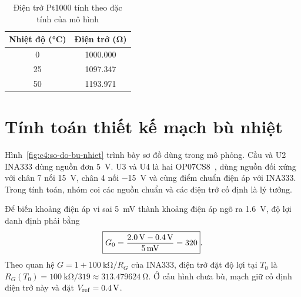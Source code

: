 \begin{table}[H]
    \centering
    \caption{Điện trở Pt1000 tính theo đặc tính của mô hình}
    \label{tab:c4:dien-tro-pt1000}
    \renewcommand{\arraystretch}{1.3}
    \begin{tabular}{|c|c|}
        \hline
        \textbf{Nhiệt độ (\unit{\celsius})} &
        \textbf{Điện trở (\unit{\ohm})} \\ \hline
        0  & 1000.000 \\ \hline
        25 & 1097.347 \\ \hline
        50 & 1193.971 \\ \hline
    \end{tabular}
\end{table}



\section{Tính toán thiết kế mạch bù nhiệt}
\label{sec:c4:tinh-toan}

Hình~\ref{fig:c4:so-do-bu-nhiet} trình bày sơ đồ dùng trong mô phỏng.
Cầu và U2 INA333 dùng nguồn đơn \qty{5}{\volt}. U3 và U4 là hai
OP07CS8~\cite{c4_op07cs8}, dùng nguồn đối xứng với chân 7 nối
\qty{15}{\volt}, chân 4 nối \qty{-15}{\volt} và cùng điểm chuẩn điện áp
với INA333. Trong tính toán, nhóm coi các nguồn chuẩn và các điện trở
cố định là lý tưởng.


Để biến khoảng điện áp vi sai \qty{5}{\milli\volt} thành khoảng điện áp
ngõ ra \qty{1.6}{\volt}, độ lợi danh định phải bằng
\[
    \boxed{G_0=
    \frac{\qty{2.0}{\volt}-\qty{0.4}{\volt}}
         {\qty{5}{\milli\volt}}=320}.
\]
Theo quan hệ $G=1+\qty{100}{\kilo\ohm}/R_G$ của INA333,
điện trở đặt độ lợi tại $T_0$ là
$R_G(T_0)=\qty{100}{\kilo\ohm}/319\approx\qty{313.479624}{\ohm}$.
Ở cấu hình chưa bù, mạch giữ cố định điện trở này và đặt
$V_{\mathrm{ref}}=\qty{0.4}{\volt}$.

